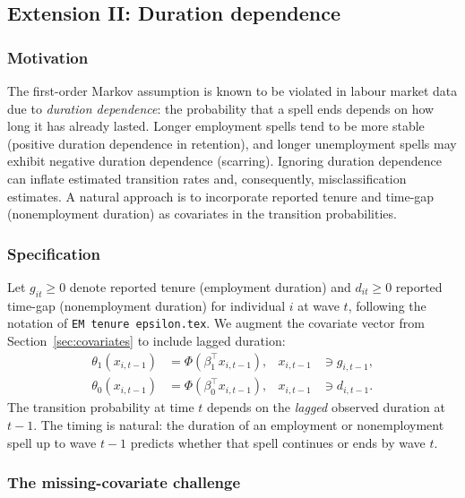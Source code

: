 \subsection{Extension II: Duration dependence}
\label{sec:duration_cov}

\subsubsection{Motivation}

The first-order Markov assumption is known to be violated in labour
market data due to \emph{duration dependence}: the probability that a
spell ends depends on how long it has already lasted. Longer employment
spells tend to be more stable (positive duration dependence in retention),
and longer unemployment spells may exhibit negative duration dependence
(scarring). Ignoring duration dependence can inflate estimated transition
rates and, consequently, misclassification estimates. A natural approach
is to incorporate reported tenure and time-gap (nonemployment duration)
as covariates in the transition probabilities.

\subsubsection{Specification}

Let \(g_{it} \ge 0\) denote reported tenure (employment duration) and
\(d_{it} \ge 0\) reported time-gap (nonemployment duration) for individual
\(i\) at wave \(t\), following the notation of \texttt{EM tenure epsilon.tex}.
We augment the covariate vector from
Section~\ref{sec:covariates} to include lagged duration:
\begin{align}
\theta_1(x_{i,t-1}) &= \Phi(\beta_1^\top x_{i,t-1}),
  & x_{i,t-1} &\ni g_{i,t-1},
  \label{eq:theta1_dur} \\
\theta_0(x_{i,t-1}) &= \Phi(\beta_0^\top x_{i,t-1}),
  & x_{i,t-1} &\ni d_{i,t-1}.
  \label{eq:theta0_dur}
\end{align}
The transition probability at time \(t\) depends on the \emph{lagged}
observed duration at \(t-1\). The timing is natural: the duration of
an employment or nonemployment spell up to wave \(t-1\) predicts
whether that spell continues or ends by wave \(t\).

\subsubsection{The missing-covariate challenge}
\label{sec:missing_cov}

